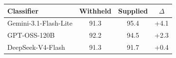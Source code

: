 \begin{tabular}{lccc}
\toprule
\textbf{Classifier} & \textbf{Withheld} & \textbf{Supplied} & \textbf{$\Delta$} \\
\midrule
Gemini-3.1-Flash-Lite & 91.3 & 95.4 & +4.1 \\
GPT-OSS-120B & 92.2 & 94.5 & +2.3 \\
DeepSeek-V4-Flash & 91.3 & 91.7 & +0.4 \\
\bottomrule
\end{tabular}
